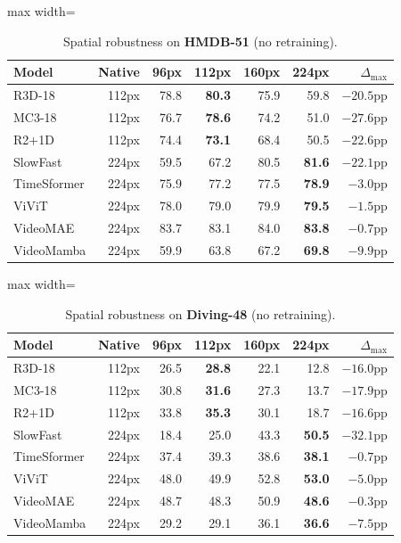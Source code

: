 \documentclass[a4paper, 10pt, conference, onecolumn]{ieeeconf}
\newcommand{\tabtight}{\setlength{\tabcolsep}{3.5pt}\renewcommand{\arraystretch}{1.12}}
\begin{document}
\begin{table}[!htbp]
\centering
\caption{Spatial robustness on \textbf{HMDB-51} (no retraining).}
\label{tab:sup_sp_hmdb}
\scriptsize\tabtight
\begin{adjustbox}{max width=\textwidth}
\begin{tabular}{l r rrrr r}
\toprule
Model & Native & 96px & 112px & 160px & 224px & $\Delta_\text{max}$ \\
\midrule
R3D-18      & 112px & 78.8 & \textbf{80.3} & 75.9 & 59.8 & $-20.5$pp \\
MC3-18      & 112px & 76.7 & \textbf{78.6} & 74.2 & 51.0 & $-27.6$pp \\
R2+1D       & 112px & 74.4 & \textbf{73.1} & 68.4 & 50.5 & $-22.6$pp \\
SlowFast    & 224px & 59.5 & 67.2 & 80.5 & \textbf{81.6} & $-22.1$pp \\
\midrule
TimeSformer & 224px & 75.9 & 77.2 & 77.5 & \textbf{78.9} & $-3.0$pp \\
ViViT       & 224px & 78.0 & 79.0 & 79.9 & \textbf{79.5} & $-1.5$pp \\
VideoMAE    & 224px & 83.7 & 83.1 & 84.0 & \textbf{83.8} & $-0.7$pp \\
VideoMamba  & 224px & 59.9 & 63.8 & 67.2 & \textbf{69.8} & $-9.9$pp \\
\bottomrule
\end{tabular}
\end{adjustbox}
\end{table}

\begin{table}[!htbp]
\centering
\caption{Spatial robustness on \textbf{Diving-48} (no retraining).}
\label{tab:sup_sp_div}
\scriptsize\tabtight
\begin{adjustbox}{max width=\textwidth}
\begin{tabular}{l r rrrr r}
\toprule
Model & Native & 96px & 112px & 160px & 224px & $\Delta_\text{max}$ \\
\midrule
R3D-18      & 112px & 26.5 & \textbf{28.8} & 22.1 & 12.8 & $-16.0$pp \\
MC3-18      & 112px & 30.8 & \textbf{31.6} & 27.3 & 13.7 & $-17.9$pp \\
R2+1D       & 112px & 33.8 & \textbf{35.3} & 30.1 & 18.7 & $-16.6$pp \\
SlowFast    & 224px & 18.4 & 25.0 & 43.3 & \textbf{50.5} & $-32.1$pp \\
\midrule
TimeSformer & 224px & 37.4 & 39.3 & 38.6 & \textbf{38.1} & $-0.7$pp \\
ViViT       & 224px & 48.0 & 49.9 & 52.8 & \textbf{53.0} & $-5.0$pp \\
VideoMAE    & 224px & 48.7 & 48.3 & 50.9 & \textbf{48.6} & $-0.3$pp \\
VideoMamba  & 224px & 29.2 & 29.1 & 36.1 & \textbf{36.6} & $-7.5$pp \\
\bottomrule
\end{tabular}
\end{adjustbox}
\end{table}
\end{document}
